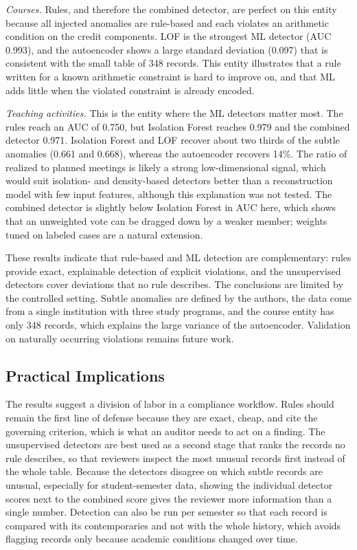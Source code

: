 \documentclass[conference]{IEEEtran}
\begin{document}
\textit{Courses.} Rules, and therefore the combined detector, are perfect on this entity because all injected anomalies are rule-based and each violates an arithmetic condition on the credit components. LOF is the strongest ML detector (AUC 0.993), and the autoencoder shows a large standard deviation (0.097) that is consistent with the small table of 348 records. This entity illustrates that a rule written for a known arithmetic constraint is hard to improve on, and that ML adds little when the violated constraint is already encoded.

\textit{Teaching activities.} This is the entity where the ML detectors matter most. The rules reach an AUC of 0.750, but Isolation Forest reaches 0.979 and the combined detector 0.971. Isolation Forest and LOF recover about two thirds of the subtle anomalies (0.661 and 0.668), whereas the autoencoder recovers 14\%. The ratio of realized to planned meetings is likely a strong low-dimensional signal, which would suit isolation- and density-based detectors better than a reconstruction model with few input features, although this explanation was not tested. The combined detector is slightly below Isolation Forest in AUC here, which shows that an unweighted vote can be dragged down by a weaker member; weights tuned on labeled cases are a natural extension.

These results indicate that rule-based and ML detection are complementary: rules provide exact, explainable detection of explicit violations, and the unsupervised detectors cover deviations that no rule describes. The conclusions are limited by the controlled setting. Subtle anomalies are defined by the authors, the data come from a single institution with three study programs, and the course entity has only 348 records, which explains the large variance of the autoencoder. Validation on naturally occurring violations remains future work.

\subsection{Practical Implications}
The results suggest a division of labor in a compliance workflow. Rules should remain the first line of defense because they are exact, cheap, and cite the governing criterion, which is what an auditor needs to act on a finding. The unsupervised detectors are best used as a second stage that ranks the records no rule describes, so that reviewers inspect the most unusual records first instead of the whole table. Because the detectors disagree on which subtle records are unusual, especially for student-semester data, showing the individual detector scores next to the combined score gives the reviewer more information than a single number. Detection can also be run per semester so that each record is compared with its contemporaries and not with the whole history, which avoids flagging records only because academic conditions changed over time.
\end{document}
